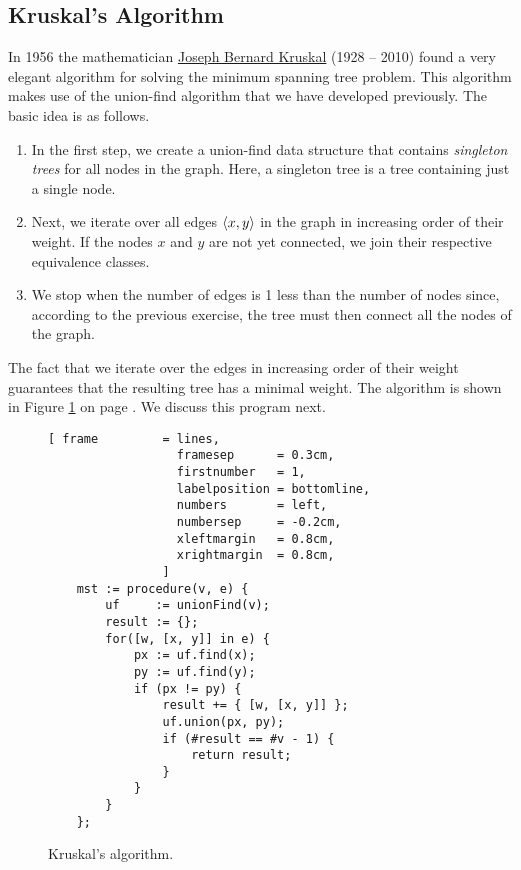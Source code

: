 \subsection{Kruskal's Algorithm}
In 1956 the mathematician \href{https://en.wikipedia.org/wiki/Joseph_Kruskal}{Joseph Bernard Kruskal} (1928 -- 2010) 
found a very elegant algorithm for solving the minimum spanning tree problem.   This algorithm makes use
of the union-find algorithm that we have developed previously.  The basic idea is as
follows.
\begin{enumerate}
\item In the first step, we create a union-find data structure that contains \emph{singleton trees}
      for all nodes in the graph.  Here, a singleton tree is a tree containing just a single node.
\item Next, we iterate over all edges $\pair(x, y)$ in the graph in increasing order of their
      weight.  If the nodes $x$ and $y$ are not yet connected, we join their respective equivalence
      classes. 
\item We stop when the number of edges is 1 less than the number of nodes since, according to the
      previous exercise, the tree must then connect all the nodes of the graph. 
\end{enumerate}
The fact that we iterate over the edges in increasing order of their weight guarantees that the
resulting tree has a minimal weight.
The algorithm is shown in Figure \ref{fig:kruskal.stlx} on page \pageref{fig:kruskal.stlx}.  We
discuss this program next. 

\begin{figure}[!ht]
\centering
\begin{Verbatim}[ frame         = lines, 
                  framesep      = 0.3cm, 
                  firstnumber   = 1,
                  labelposition = bottomline,
                  numbers       = left,
                  numbersep     = -0.2cm,
                  xleftmargin   = 0.8cm,
                  xrightmargin  = 0.8cm,
                ]
    mst := procedure(v, e) {
        uf     := unionFind(v);
        result := {};
        for([w, [x, y]] in e) {
            px := uf.find(x);
            py := uf.find(y);
            if (px != py) {
                result += { [w, [x, y]] };
                uf.union(px, py);
                if (#result == #v - 1) {
                    return result;
                }
            }
        }        
    };
\end{Verbatim}
\vspace*{-0.3cm}
\caption{Kruskal's algorithm.}
\label{fig:kruskal.stlx}
\end{figure}

